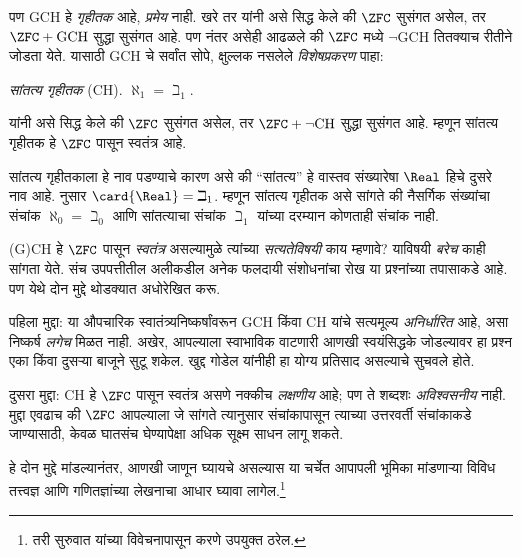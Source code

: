 \documentclass[../../../include/open-logic-section]{subfiles}
\begin{document}
पण GCH हे \emph{गृहीतक} आहे, \emph{प्रमेय} नाही. खरे तर \citet{Godel1938} यांनी असे सिद्ध केले की $\ZFC$ सुसंगत असेल, तर $\ZFC + \text{GCH}$ सुद्धा सुसंगत आहे. पण नंतर असेही आढळले की $\ZFC$ मध्ये $\lnot$GCH तितक्याच रीतीने जोडता येते. यासाठी GCH चे सर्वांत सोपे, क्षुल्लक नसलेले \emph{विशेषप्रकरण} पाहा:

\begin{defish}
\emph{सांतत्य गृहीतक} (CH). $\aleph_1 = \beth_1$.
\end{defish}

\citet{Cohen1963} यांनी असे सिद्ध केले की $\ZFC$ सुसंगत असेल, तर $\ZFC
+ \lnot\text{CH}$ सुद्धा सुसंगत आहे. म्हणून सांतत्य गृहीतक हे $\ZFC$ पासून स्वतंत्र आहे.

सांतत्य गृहीतकाला हे नाव पडण्याचे कारण असे की “सांतत्य” हे वास्तव संख्यारेषा $\Real$ हिचे दुसरे नाव आहे.  नुसार $\card{\Real} =
\beth_1$. म्हणून सांतत्य गृहीतक असे सांगते की नैसर्गिक संख्यांचा संचांक $\aleph_0 = \beth_0$ आणि सांतत्याचा संचांक $\beth_1$ यांच्या दरम्यान कोणताही संचांक नाही.

(G)CH हे $\ZFC$ पासून \emph{स्वतंत्र} असल्यामुळे त्यांच्या \emph{सत्यतेविषयी} काय म्हणावे? याविषयी \emph{बरेच} काही सांगता येते. संच उपपत्तीतील अलीकडील अनेक फलदायी संशोधनांचा रोख या प्रश्नांच्या तपासाकडे आहे. पण येथे दोन मुद्दे थोडक्यात अधोरेखित करू.

पहिला मुद्दा: या औपचारिक स्वातंत्र्यनिष्कर्षांवरून GCH किंवा CH यांचे सत्यमूल्य \emph{अनिर्धारित} आहे, असा निष्कर्ष \emph{लगेच} मिळत नाही. अखेर, आपल्याला स्वाभाविक वाटणारी आणखी स्वयंसिद्धके जोडल्यावर हा प्रश्न एका किंवा दुसऱ्या बाजूने सुटू शकेल. खुद्द गोडेल यांनीही हा योग्य प्रतिसाद असल्याचे सुचवले होते.

दुसरा मुद्दा: CH हे $\ZFC$ पासून स्वतंत्र असणे नक्कीच \emph{लक्षणीय} आहे; पण ते शब्दशः \emph{अविश्वसनीय} नाही. मुद्दा एवढाच की $\ZFC$ आपल्याला जे सांगते त्यानुसार संचांकापासून त्याच्या उत्तरवर्ती संचांकाकडे जाण्यासाठी, केवळ घातसंच घेण्यापेक्षा अधिक सूक्ष्म साधन लागू शकते.

हे दोन मुद्दे मांडल्यानंतर, आणखी जाणून घ्यायचे असल्यास या चर्चेत आपापली भूमिका मांडणाऱ्या विविध तत्त्वज्ञ आणि गणितज्ञांच्या लेखनाचा आधार घ्यावा लागेल.\footnote{तरी सुरुवात \citet[\S15.6]{Potter2004} यांच्या विवेचनापासून करणे उपयुक्त ठरेल.}
\end{document}
